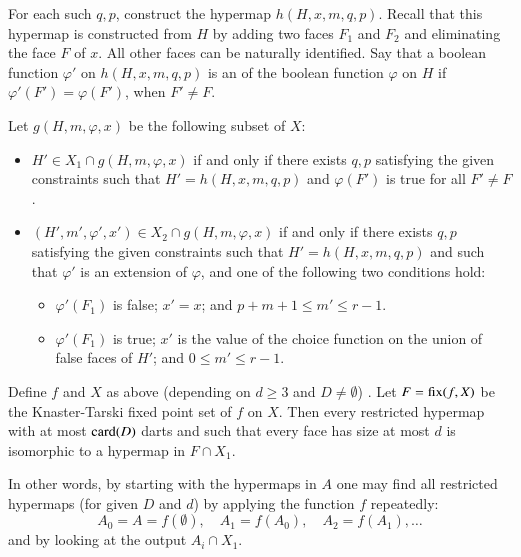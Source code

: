 For each such $q,p$, construct the hypermap $h(H,x,m,q,p)$.  Recall
that this hypermap is constructed from $H$ by adding two faces $F_1$
and $F_2$ and eliminating the face $F$ of $x$.  All other faces can be
naturally identified.  Say that a boolean function $\varphi'$ on
$h(H,x,m,q,p)$ is an  of the boolean function
$\varphi$ on $H$ if $\varphi'(F') =\varphi(F')$, when $F'\ne F$.
%

Let $g(H,m,\varphi,x)$ be the following subset of $X$:
\begin{itemize}
\item $H'\in X_1\cap g(H,m,\varphi,x)$ if and only if there exists
$q,p$ satisfying the given constraints such that $H'=h(H,x,m,q,p)$
and $\varphi(F')$ is true for all $F'\ne F$.
\item $(H',m',\varphi',x')\in X_2\cap g(H,m,\varphi,x)$ if and only if
there exists $q,p$ satisfying the given constraints such that
$H'=h(H,x,m,q,p)$ and such that $\varphi'$ is an extension of
$\varphi$, and one of the following two conditions hold:
\begin{itemize}
\item $\varphi'(F_1)$ is false;  $x' = x$; and  $p+m+1 \le m' \le r-1$.
\item $\varphi'(F_1)$ is true; $x'$ is the value of the choice
function on the union of false faces of $H'$; and $0 \le m' \le
r-1$.
\end{itemize}
\end{itemize}





\begin{lemma}  
Define $f $ and $X$ as above (depending on $d\ge 3$ and $D\ne
\emptyset$) .  Let $F={\operatorname{fix}}(f,X)$ be the Knaster-Tarski fixed
point set of $f$ on $X$.  Then every restricted hypermap with at
most ${\operatorname{card}}(D)$ darts and such that every face has size at most $d$
is isomorphic to a hypermap in $F\cap X_1$.
\end{lemma}
%

In other words, by starting with the  hypermaps in $A$
one may find all restricted hypermaps (for given $D$ and $d$) by
applying the function $f$ repeatedly:
\begin{displaymath}
A_0 = A = f(\emptyset),\quad A_1 = f(A_0),\quad A_2 = f(A_1),\ldots
\end{displaymath}
and by looking at the output $A_i \cap X_1$.
%

